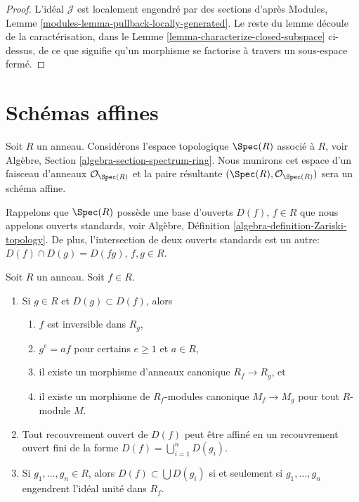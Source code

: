 \begin{proof}
L'idéal  $\mathcal{J}$  est localement engendré par des sections d'après Modules, Lemme
 \ref{modules-lemma-pullback-locally-generated}. Le reste du lemme découle de la caractérisation, dans le Lemme
 \ref{lemma-characterize-closed-subspace}  ci-dessus, de ce que signifie qu'un morphisme se factorise à travers
un sous-espace fermé.
\end{proof}














\section{Schémas affines}
\label{section-affine-schemes}

\noindent
Soit  $R$  un anneau. Considérons l'espace topologique  $\Spec(R)$  associé
à  $R$, voir Algèbre, Section  \ref{algebra-section-spectrum-ring}. Nous munirons cet espace d'un
faisceau d'anneaux  $\mathcal{O}_{\Spec(R)}$  et la paire résultante  $(\Spec(R), \mathcal{O}_{\Spec(R)})$  sera un schéma
affine.

\medskip\noindent
Rappelons que  $\Spec(R)$  possède une base d'ouverts  $D(f)$,  $f \in R$ 
que nous appelons ouverts standards, voir Algèbre, Définition  \ref{algebra-definition-Zariski-topology}. De
plus, l'intersection de deux ouverts standards est un autre:  $D(f) \cap D(g) = D(fg)$,
 $f, g\in R$.

\begin{lemma}
\label{lemma-standard-open}
Soit  $R$  un anneau. Soit  $f \in R$.
\begin{enumerate}
\item Si  $g\in R$  et  $D(g) \subset D(f)$, alors
\begin{enumerate}
\item $f$  est inversible dans  $R_g$,
\item $g^e = af$  pour certains  $e \geq 1$  et  $a \in R$,
\item il existe un morphisme d'anneaux canonique  $R_f \to R_g$, et
\item il existe un morphisme de  $R_f$-modules canonique  $M_f \to M_g$  pour tout
 $R$-module  $M$.
\end{enumerate}
\item Tout recouvrement ouvert de  $D(f)$  peut être affiné en un recouvrement
ouvert fini de la forme  $D(f) = \bigcup_{i = 1}^n D(g_i)$.
\item Si  $g_1, \ldots, g_n \in R$, alors  $D(f) \subset \bigcup D(g_i)$  si et seulement si  $g_1, \ldots, g_n$  engendrent
l'idéal unité dans  $R_f$.
\end{enumerate}
\end{lemma}

